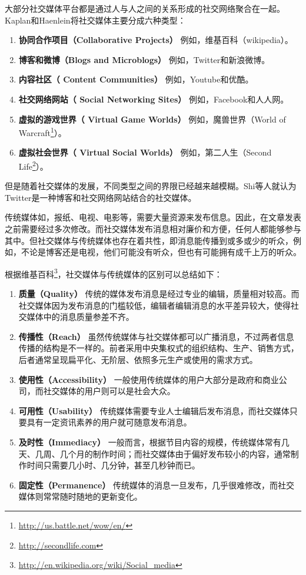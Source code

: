 大部分社交媒体平台都是通过人与人之间的关系形成的社交网络聚合在一起。Kaplan和Haenlein将社交媒体主要分成六种类型：
  \begin{enumerate}
  \item  \textbf{协同合作项目（Collaborative Projects）} 例如，维基百科（wikipedia）。
  \item   \textbf{博客和微博（Blogs and Microblogs）} 例如，Twitter和新浪微博。
   \item  \textbf{内容社区（ Content Communities）} 例如，Youtube和优酷。
  \item  \textbf{社交网络网站（ Social Networking Sites）} 例如，Facebook和人人网。
 \item  \textbf{虚拟的游戏世界（ Virtual Game Worlds）} 例如，魔兽世界（World of Warcraft\footnote{\url{http://us.battle.net/wow/en/}}）。
  \item  \textbf{虚拟社会世界（ Virtual Social Worlds）} 例如，第二人生（Second Life\footnote{\url{http://secondlife.com}}）。
  \end{enumerate}  
但是随着社交媒体的发展，不同类型之间的界限已经越来越模糊。Shi等人就认为Twitter是一种博客和社交网络网站结合的社交媒体。

传统媒体如，报纸、电视、电影等，需要大量资源来发布信息。因此，在文章发表之前需要经过多次修改。而社交媒体发布消息相对廉价和方便，任何人都能够参与其中。但社交媒体与传统媒体也存在着共性，即消息能传播到或多或少的听众，例如，不论是博客还是电视，他们可能没有听众，但也有可能拥有成千上万的听众。

根据维基百科\footnote{\url{http://en.wikipedia.org/wiki/Social_media}}，社交媒体与传统媒体的区别可以总结如下：
  \begin{enumerate}
    \item  \textbf{质量（Quality）} 传统的媒体发布消息是经过专业的编辑，质量相对较高。而社交媒体因为发布消息的门槛较低，编辑者编辑消息的水平差异较大，使得社交媒体中的消息质量参差不齐。
   \item  \textbf{传播性（Reach）} 虽然传统媒体与社交媒体都可以广播消息，不过两者信息传播的结构是不一样的。前者采用中央集权式的组织结构、生产、销售方式，后者通常呈现扁平化、无阶层、依照多元生产或使用的需求方式。
 \item  \textbf{使用性（Accessibility）} 一般使用传统媒体的用户大部分是政府和商业公司，而社交媒体的用户则可以是社会大众。
 \item  \textbf{可用性（Usability）} 传统媒体需要专业人士编辑后发布消息，而社交媒体只要具有一定资讯素养的用户就可随意发布消息。
\item  \textbf{及时性（Immediacy）} 一般而言，根据节目内容的规模，传统媒体常有几天、几周、几个月的制作时间；而社交媒体由于偏好发布较小的内容，通常制作时间只需要几小时、几分钟，甚至几秒钟而已。
\item  \textbf{固定性（Permanence）}  传统媒体的消息一旦发布，几乎很难修改，而社交媒体则常常随时随地的更新变化。
  \end{enumerate}  
  
